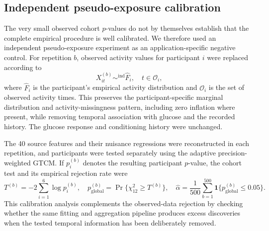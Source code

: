 \documentclass[12pt]{article}
\numberwithin{equation}{section}
\begin{document}
\subsection{Independent pseudo-exposure calibration}
\label{sec:ohiot1dm_pseudo_exposure}

The very small observed cohort \(p\)-values do not by themselves establish
that the complete empirical procedure is well calibrated. We therefore used
an independent pseudo-exposure experiment as an application-specific negative
control. For repetition \(b\), observed activity values for participant \(i\)
were replaced according to
\begin{equation}
X^{(b)}_{it}\mathrel{\mathop{\sim}^{\mathrm{ind}}}\widehat F_i,
 \quad t\in\mathcal O_i,
 \label{eq:ohiot1dm_pseudo_exposure}
\end{equation}
where \(\widehat F_i\) is the participant's empirical activity distribution
and \(\mathcal O_i\) is the set of observed activity times. This preserves the
participant-specific marginal distribution and activity-missingness pattern,
including zero inflation where present, while removing temporal association
with glucose and the recorded history. The glucose response and conditioning
history were unchanged.

The 40 source features and their nuisance regressions were reconstructed in
each repetition, and participants were tested separately using the adaptive
precision-weighted GTCM. If \(p_i^{(b)}\) denotes the resulting participant
\(p\)-value, the cohort test and its empirical rejection rate were
\begin{equation}
 T^{(b)}=-2\sum_{i=1}^{6}\log p_i^{(b)},\quad
 p_{\mathrm{global}}^{(b)}=\Pr\{\chi^2_{12}\geq T^{(b)}\},
 \quad
 \widehat\alpha=\frac{1}{500}\sum_{b=1}^{500}
 \mathbf 1\{p_{\mathrm{global}}^{(b)}\leq0.05\}.
 \label{eq:ohiot1dm_pseudo_calibration}
\end{equation}
This calibration analysis complements the observed-data rejection by checking
whether the same fitting and aggregation pipeline produces excess discoveries
when the tested temporal information has been deliberately removed.
\end{document}

